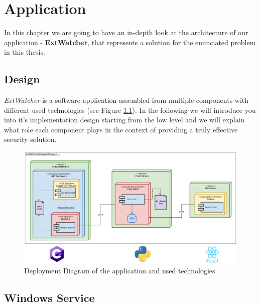 \chapter{Application}
\label{chapter:application}
In this chapter we are going to have an in-depth look at the architecture of our application - \textbf{ExtWatcher}, that represents a solution for the enunciated problem in this thesis.


\section{Design}
\label{section:design}
\textit{ExtWatcher} is a software application assembled from multiple components with different used technologies (see Figure \ref{deployment}). In the following we will introduce you into it's implementation design starting from the low level and we will explain what role each component plays in the context of providing a truly effective security solution. 

\begin{figure}[H]
	\centerline{\includegraphics[scale=0.4]{figures/deployTech.png}}  
	\caption{Deployment Diagram of the application and used technologies}
	\label{deployment}
\end{figure}




\section{Windows Service}
\label{section:winService}


